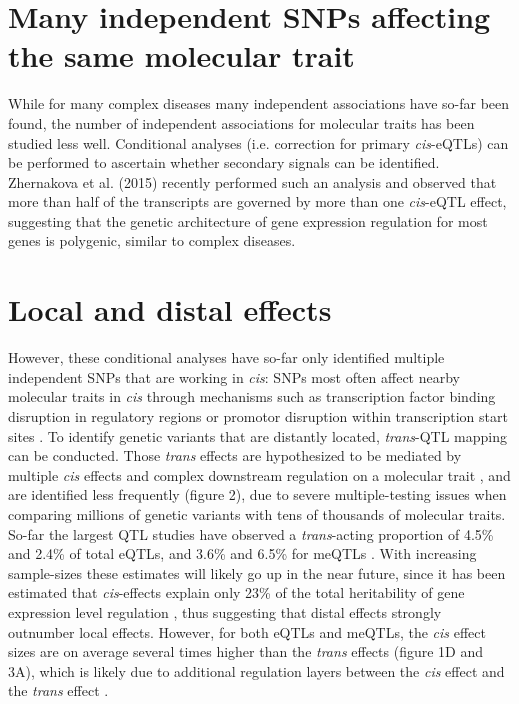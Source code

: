 \section{Many independent SNPs affecting the same molecular trait}
While for many complex diseases many independent associations have so-far been found, the number of independent associations for molecular traits has been studied less well. Conditional analyses (i.e. correction for primary \emph{cis}-eQTLs) can be performed to ascertain whether secondary signals can be identified. Zhernakova et al. (2015) recently performed such an analysis and observed that more than half of the transcripts are governed by more than one \emph{cis}-eQTL effect, suggesting that the genetic architecture of gene expression regulation for most genes is polygenic, similar to complex diseases.

\section{Local and distal effects}
However, these conditional analyses have so-far only identified multiple independent SNPs that are working in \emph{cis}: SNPs most often affect nearby molecular traits in \emph{cis} through mechanisms such as transcription factor binding disruption in regulatory regions or promotor disruption within transcription start sites \cite{brownIntegrativeModelingEQTLs2013}. To identify genetic variants that are distantly located, \emph{trans}-QTL mapping can be conducted. Those \emph{trans} effects are hypothesized to be mediated by multiple \emph{cis} effects and complex downstream regulation on a molecular trait \cite{westraSystematicIdentificationTrans2013,wongInterplayCisTrans2017}, and are identified less frequently (figure 2), due to severe multiple-testing issues when comparing millions of genetic variants with tens of thousands of molecular traits. So-far the largest QTL studies have observed a \emph{trans}-acting proportion of 4.5\% \cite{westraSystematicIdentificationTrans2013} and 2.4\% \cite{wrightHeritabilityGenomicsGene2014} of total eQTLs, and 3.6\% \cite{bonderDiseaseVariantsAlter2017} and 6.5\% for meQTLs \cite{gauntSystematicIdentificationGenetic2016}. With increasing sample-sizes these estimates will likely go up in the near future, since it has been estimated that \emph{cis}-effects explain only 23\% of the total heritability of gene expression level regulation \cite{wrightHeritabilityGenomicsGene2014}, thus suggesting that distal effects strongly outnumber local effects. However, for both eQTLs and meQTLs, the \emph{cis} effect sizes are on average several times higher than the \emph{trans} effects (figure 1D and 3A), which is likely due to additional regulation layers between the \emph{cis} effect and the \emph{trans} effect \cite{albertRoleRegulatoryVariation2015}. 

